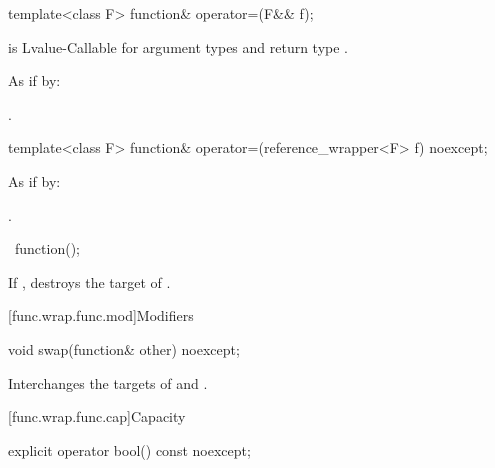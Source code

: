 %
\begin{itemdecl}
template<class F> function& operator=(F&& f);
\end{itemdecl}

\begin{itemdescr}
\pnum
\constraints
{} is Lvalue-Callable
for argument types  and return type .

\pnum
\effects
As if by: 

\pnum
\returns
{}.
\end{itemdescr}

%
\begin{itemdecl}
template<class F> function& operator=(reference_wrapper<F> f) noexcept;
\end{itemdecl}

\begin{itemdescr}
\pnum
\effects
As if by: 

\pnum
\returns
{}.
\end{itemdescr}

%
\begin{itemdecl}
~function();
\end{itemdecl}

\begin{itemdescr}
\pnum
\effects
If , destroys the target of .
\end{itemdescr}

[func.wrap.func.mod]{Modifiers}

%
\begin{itemdecl}
void swap(function& other) noexcept;
\end{itemdecl}

\begin{itemdescr}
\pnum
\effects
Interchanges the targets of  and .
\end{itemdescr}

[func.wrap.func.cap]{Capacity}

\begin{indexed}{}
\begin{itemdecl}
explicit operator bool() const noexcept;
\end{itemdecl}
\end{indexed}

